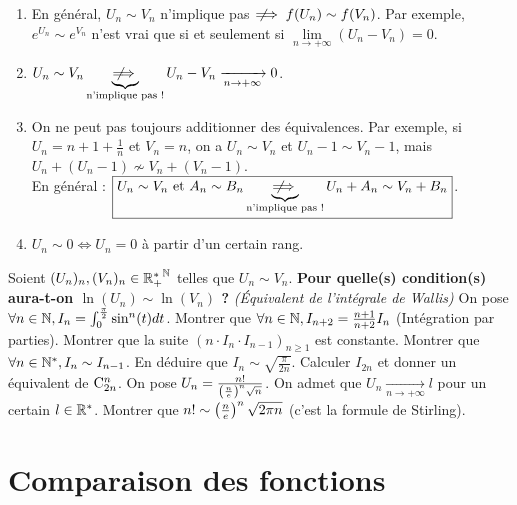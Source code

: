 \documentclass[12pt, a4paper]{report}
\begin{document}
\begin{remark}
    \begin{enumerate}
        \item En général, $U_n \sim V_n$ n'implique pas $\;\not\!\!\!\implies f(U_n) \sim f(V_n)$. Par exemple, $e^{U_n} \sim e^{V_n}$ n'est vrai que si et seulement si $\lim\limits_{n\to+\infty} (U_n - V_n) = 0$.
        \item $U_n \sim V_n \underbrace{\;\not\!\!\!\implies}_{\text{n'implique pas !}} U_n - V_n \xrightarrow[n\to+\infty]{} 0$.
        \item On ne peut pas toujours additionner des équivalences. Par exemple, si $U_n = n + 1 + \frac{1}{n}$ et $V_n = n$, on a $U_n \sim V_n$ et $U_n - 1 \sim V_n - 1$, mais $U_n + (U_n - 1) \nsim V_n + (V_n - 1)$.\\En général : $\boxed{U_n \sim V_n$ et $A_n \sim B_n \underbrace{\;\not\!\!\!\implies}_{\text{n'implique pas !}} U_n + A_n \sim V_n + B_n}$.
        \item $U_n \sim 0 \iff U_n = 0$ à partir d'un certain rang.
    \end{enumerate}
\end{remark}

\begin{exercise}
    \begin{outline}[enumerate]
        \1 Soient $(U_n)_n, (V_n)_n \in {\mathbb{R}_+^*}^{\mathbb{N}}$ telles que $U_n \sim V_n$. \textbf{Pour quelle(s) condition(s) aura-t-on $\ln(U_n) \sim \ln(V_n)$ ?}
        \1 \textit{(Équivalent de l'intégrale de Wallis)} On pose $\forall n \in \mathbb{N}, I_n = \int_0^{\frac{\pi}{2}} \sin^n(t) dt$.
        \2 Montrer que $\forall n \in \mathbb{N}, I_{n+2} = \frac{n+1}{n+2} I_{n}$ (Intégration par parties).
        \2 Montrer que la suite $(n\cdot I_n \cdot I_{n-1})_{n\ge1}$ est constante.
        \2 Montrer que $\forall n \in \mathbb{N}^*, I_n \sim I_{n-1}$.
        \2 En déduire que $I_n \sim \sqrt{\frac{\pi}{2n}}$.
        \2 Calculer $I_{2n}$ et donner un équivalent de $\mathrm{C}_{2n}^{n}$.
        \2 On pose $U_n=\frac{n!}{\left(\frac{n}{e}\right)^n \sqrt{n}}$. On admet que $U_n \xrightarrow[n\to+\infty]{} l$ pour un certain $l \in \mathbb{R}^*$. Montrer que $n! \sim \left(\frac{n}{e}\right)^n \sqrt{2\pi n}$ (c'est la formule de Stirling).
    \end{outline}
\end{exercise}

\section{Comparaison des fonctions}
\end{document}
